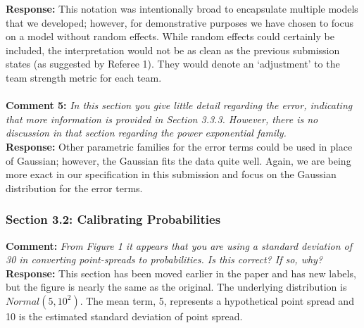 \documentclass[11pt]{article} %
\begin{document}
{\bf Response:} This notation was intentionally broad to encapsulate multiple models that we developed; however, for demonstrative purposes we have chosen to focus on a model without random effects. While random effects could certainly be included, the interpretation would not be as clean as the previous submission states (as suggested by Referee 1). They would denote an `adjustment' to the team strength metric for each team.\\
\\
{\bf Comment 5:} \emph{In this section you give little detail regarding the error, indicating that more information is provided in Section 3.3.3. However, there is no discussion in that section regarding the power exponential family.\\}
{\bf Response:} Other parametric families for the error terms could be used in place of Gaussian; however, the Gaussian fits the data quite well. Again, we are being more exact in our specification in this submission and focus on the Gaussian distribution for the error terms.\\

\subsubsection*{Section 3.2: Calibrating Probabilities}
{\bf Comment:} \emph{From Figure 1 it appears that you are using a standard deviation of 30 in converting point-spreads to probabilities. Is this correct? If so, why?\\}
{\bf Response:} This section has been moved earlier in the paper and has new labels, but the figure is nearly the same as the original. The underlying distribution is $Normal(5,10^2).$ The mean term, 5, represents a hypothetical point spread and 10 is the estimated standard deviation of point spread. \\
\end{document}
